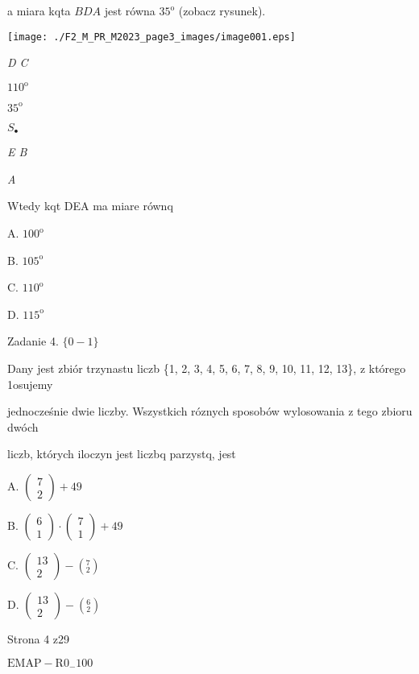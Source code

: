 \documentclass[a4paper,12pt]{article}
\begin{document}
a miara kqta $BDA$ jest równa $35^{\mathrm{o}}$ (zobacz rysunek).
\begin{center}
\texttt{[image: ./F2\_M\_PR\_M2023\_page3\_images/image001.eps]}
\end{center}
{\it D  C}

$110^{\mathrm{o}}$

$35^{\mathrm{o}}$

$S_{\bullet}$

{\it E  B}

{\it A}

Wtedy kqt DEA ma miare równq

A. $100^{\mathrm{o}}$

B. $105^{\mathrm{o}}$

C. $110^{\mathrm{o}}$

D. $115^{\mathrm{o}}$

Zadanie 4. $\{0-1\}$

Dany jest zbiór trzynastu liczb \{1, 2, 3, 4, 5, 6, 7, 8, 9, 10, 11, 12, 13\}, z którego 1osujemy

jednocześnie dwie liczby. Wszystkich róznych sposobów wylosowania z tego zbioru dwóch

liczb, których iloczyn jest liczbq parzystq, jest

A. $\left(\begin{array}{l}
7\\
2
\end{array}\right)+49$

B. $\left(\begin{array}{l}
6\\
1
\end{array}\right)\cdot\left(\begin{array}{l}
7\\
1
\end{array}\right)+49$

C. $\left(\begin{array}{l}
13\\
2
\end{array}\right)-(_{2}^{7})$

D. $\left(\begin{array}{l}
13\\
2
\end{array}\right)-(_{2}^{6})$

Strona 4 z29

$\mathrm{E}\mathrm{M}\mathrm{A}\mathrm{P}-\mathrm{R}0_{-}100$
\end{document}
